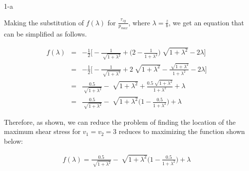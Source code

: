 \documentclass[11pt]{article}
\begin{document}
\begin{prob}{1-a}
\end{prob}
\begin{sol} 

Making the substitution of $f(\lambda)$ for $\frac{\tau_{zy}}{p_{max}}$, where $\lambda = \frac{z}{b}$, we get an equation that can be simplified as follows.

\begin{eqnarray*}
f(\lambda) & = & -\frac{1}{2}\Bigg[ -\frac{1}{\sqrt[]{1 + \lambda^2}} +  \Bigg(2 - \frac{1}{1 + \lambda^2}\Bigg) \sqrt[]{1 + \lambda^2} -2\lambda \Bigg] \\
& = & -\frac{1}{2}\Bigg[ -\frac{1}{\sqrt[]{1 + \lambda^2}} +  2\sqrt[]{1 + \lambda^2} - \frac{\sqrt[]{1 + \lambda^2}}{1 + \lambda^2} -2\lambda \Bigg] \\
& = & \frac{0.5}{\sqrt[]{1 + \lambda^2}} - \sqrt[]{1 + \lambda^2} + \frac{0.5\sqrt[]{1 + \lambda^2}}{1 + \lambda^2} + \lambda \\
& = & \frac{0.5}{\sqrt[]{1 + \lambda^2}} - \sqrt[]{1 + \lambda^2}\Bigg(1 - \frac{0.5}{1 + \lambda^2}\Bigg) + \lambda
\end{eqnarray*}

Therefore, as shown, we can reduce the problem of finding the location of the maximum shear stress for $v_{1} = v_{2} = 3$ reduces to maximizing the function shown below:

\begin{eqnarray}
\label{OriginalFunc}
f(\lambda) = \frac{0.5}{\sqrt[]{1 + \lambda^2}} - \sqrt[]{1 + \lambda^2}\Bigg(1 - \frac{0.5}{1 + \lambda^2}\Bigg) + \lambda
\end{eqnarray}

\end{sol}
\end{document}
